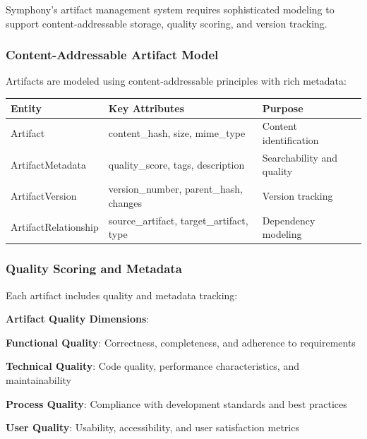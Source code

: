 Symphony's artifact management system requires sophisticated modeling to support content-addressable storage, quality scoring, and version tracking.

\subsubsection*{Content-Addressable Artifact Model}

Artifacts are modeled using content-addressable principles with rich metadata:

\begin{center}
\begin{tabular}{@{}lll@{}}
\toprule
\textbf{Entity} & \textbf{Key Attributes} & \textbf{Purpose} \\
\midrule
Artifact & content\_hash, size, mime\_type & Content identification \\
ArtifactMetadata & quality\_score, tags, description & Searchability and quality \\
ArtifactVersion & version\_number, parent\_hash, changes & Version tracking \\
ArtifactRelationship & source\_artifact, target\_artifact, type & Dependency modeling \\
\bottomrule
\end{tabular}
\end{center}

\subsubsection*{Quality Scoring and Metadata}

Each artifact includes quality and metadata tracking:

\begin{successbox}
\textbf{Artifact Quality Dimensions}:
\begin{compactlist}
    \item \textbf{Functional Quality}: Correctness, completeness, and adherence to requirements
    \item \textbf{Technical Quality}: Code quality, performance characteristics, and maintainability
    \item \textbf{Process Quality}: Compliance with development standards and best practices
    \item \textbf{User Quality}: Usability, accessibility, and user satisfaction metrics
\end{compactlist}
\end{successbox}

